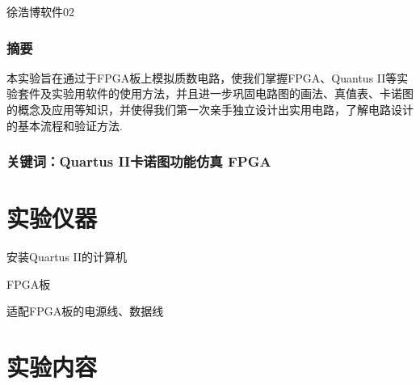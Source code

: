 \documentclass[UTF8]{ctexart}
\begin{document}
\renewcommand{\thefootnote}{\fnsymbol{footnote}}
\linespread{1.4}
\title{\vspace{-5em}\vspace{-2.5em}}
\date{}
\maketitle
\begin{center}
{\fangsong 徐浩博\quad 软件02}
\end{center}

\subsubsection*{摘要}
{\kaishu\normalsize  本实验旨在通过于FPGA板上模拟质数电路，使我们掌握FPGA、Quantus II等实验套件及实验用软件的使用方法，并且进一步巩固电路图的画法、真值表、卡诺图的概念及应用等知识，并使得我们第一次亲手独立设计出实用电路，了解电路设计的基本流程和验证方法.}
\subsubsection*{关键词：Quartus II\quad 卡诺图\quad 功能仿真 \quad FPGA\quad \vspace{1.5em}}


\section{实验仪器}
安装Quartus II的计算机\par
FPGA板\par
适配FPGA板的电源线、数据线
\par

\section{实验内容}
\end{document}
